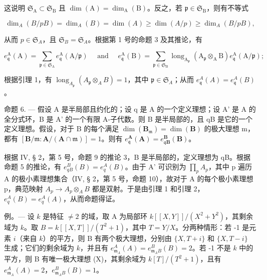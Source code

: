 这说明 \(\mathfrak{S}_{\mathrm{A}} \subset \mathfrak{S}_{\mathrm{B}}\) 且 \(\dim(\mathrm{A}) = \dim_{\mathrm{A}}(\mathrm{B})\)。反之，若 \(\mathfrak{p} \in \mathfrak{S}_{\mathrm{B}}\)，则有不等式

\[
\dim_ {A} (B / p B) = \dim_ {A} (B) = \dim (A) \geqslant \dim (A / p) \geqslant \dim_ {A} (B / p B),
\]

从而 \(p \in \mathfrak{S}_A\)，且 \(\mathfrak{S}_B = \mathfrak{S}_A\)。根据第 1 号的命题 3 及其推论，有

\[
e _ {\mathfrak {q}} ^ {\mathrm{A}} (\mathrm{A}) = \sum_ {\mathfrak {p} \in \mathfrak {S} _ {\mathrm{A}}} e _ {\mathfrak {q}} ^ {\mathrm{A}} (\mathrm{A} / \mathfrak {p}) \quad \text { and } \quad e _ {\mathfrak {q}} ^ {\mathrm{A}} (\mathrm{B}) = \sum_ {\mathfrak {p} \in \mathfrak {S} _ {\mathrm{B}}} \operatorname{long} _ {\mathrm{A} _ {\mathfrak {p}}} (\mathrm{A} _ {\mathfrak {p}} \otimes_ {\mathrm{A}} \mathrm{B}) e _ {\mathfrak {q}} ^ {\mathrm{A}} (\mathrm{A} / \mathfrak {p});
\]

根据引理 1，有 \(\operatorname{long}_{A_{\mathfrak{p}}}(A_{\mathfrak{p}} \otimes_{A} B) = 1\)，其中 \(\mathfrak{p} \in \mathfrak{S}_{A}\)；从而 \(e_{\mathfrak{q}}^{A}(A) = e_{\mathfrak{q}}^{A}(B)\)。

命题 6. --- 假设 A 是半局部且约化的；设 q 是 A 的一个定义理想；设 A' 是 A 的全分式环，B 是 A' 的一个有限 A-子代数。则 B 是半局部的，且 qB 是它的一个定义理想。假设，对于 B 的每个满足 \(\dim(\mathbf{B}_{\mathfrak{m}})=\dim(\mathbf{B})\) 的极大理想 m，都有 \([\mathbf{B}/\mathfrak{m}:\mathbf{A}/(\mathbf{A}\cap\mathfrak{m})]=1\)。则有 \(e_{\mathfrak{q}}^{\mathbf{A}}(\mathbf{A})=e_{\mathfrak{q}\mathbf{B}}^{\mathbf{B}}(\mathbf{B})\)。

根据 IV, § 2，第 5 号，命题 9 的推论 3，B 是半局部的，定义理想为 qB。根据命题 5 的推论，有 \(e_{qB}^{B}(B) = e_{q}^{A}(B)\)。由于 A' 可识别为 \(\prod_{p} A_p\)，其中 p 遍历 A 的极小素理想集合（IV, § 2，第 5 号，命题 10），故对于 A 的每个极小素理想 p，典范映射 \(A_{p} \to A_{p} \otimes_{A} B\) 都是双射。于是由引理 1 和引理 2，\(e_{q}^{A}(B) = e_{q}^{A}(A)\)，从而命题得证。

例。--- 设 \(k\) 是特征 \(\neq 2\) 的域，取 A 为局部环 \(k[[X, Y]]/(X^{2} + Y^{2})\)，其剩余域为 \(k\)。取 \(B = k[[X, T]]/(T^{2} + 1)\)，其中 \(T = Y/X\)。分两种情形：若 -1 是元素 \(i\)（来自 \(k\)）的平方，则 B 有两个极大理想，分别由 \(\{X, T + i\}\) 和 \(\{X, T - i\}\) 生成；它们的剩余域为 \(k\)，并且有 \(e_{\mathfrak{m}_{A}}^{A}(A) = e_{\mathfrak{m}_{A}B}^{B}(B) = 2\)。若 -1 不是 \(k\) 中的平方，则 B 有唯一极大理想 (X)，其剩余域为 \(k[T]/(T^{2} + 1)\)，且有 \(e_{\mathfrak{m}_{A}}^{A}(A) = 2\)，\(e_{\mathfrak{m}_{A}B}^{B}(B) = 1\)。

